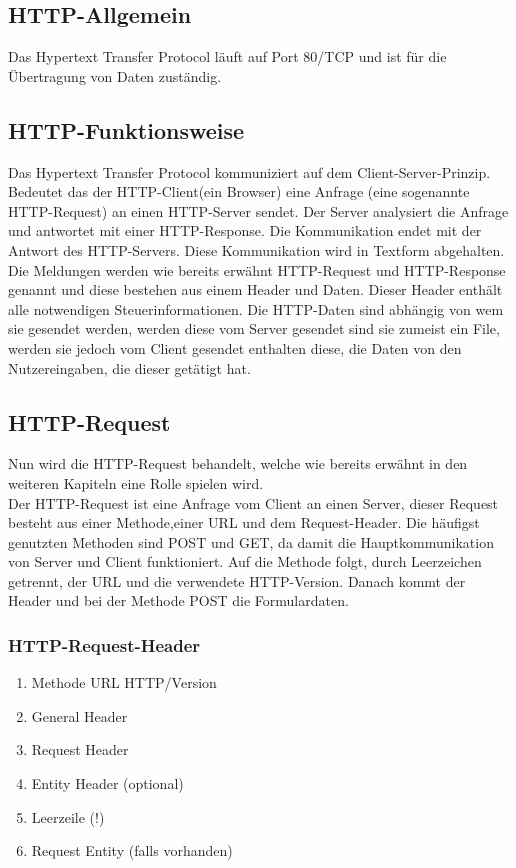 \subsection{HTTP-Allgemein}
Das Hypertext Transfer Protocol läuft auf Port 80/TCP und ist für die Übertragung von Daten zuständig.
\subsection{HTTP-Funktionsweise}
Das Hypertext Transfer Protocol kommuniziert auf dem Client-Server-Prinzip. Bedeutet das der HTTP-Client(ein Browser) eine Anfrage (eine sogenannte HTTP-Request) an einen HTTP-Server sendet. Der Server analysiert die Anfrage und antwortet mit einer HTTP-Response. Die Kommunikation endet mit der Antwort des HTTP-Servers. Diese Kommunikation wird in Textform abgehalten. Die Meldungen werden wie bereits erwähnt HTTP-Request und HTTP-Response genannt und diese bestehen aus einem Header und Daten. Dieser Header enthält alle notwendigen Steuerinformationen. Die HTTP-Daten sind abhängig von wem sie gesendet werden, werden diese vom Server gesendet sind sie zumeist ein File, werden sie jedoch vom Client gesendet enthalten diese, die  Daten von den Nutzereingaben, die dieser getätigt hat.
\subsection{HTTP-Request}
Nun wird die HTTP-Request behandelt, welche wie bereits erwähnt in den weiteren Kapiteln eine Rolle spielen wird.\\Der HTTP-Request ist eine Anfrage vom Client an einen Server, dieser Request besteht aus einer Methode,einer URL und dem Request-Header. Die häufigst genutzten Methoden sind POST und GET, da damit die Hauptkommunikation von Server und Client funktioniert. Auf die Methode folgt, durch Leerzeichen getrennt, der URL und die verwendete HTTP-Version. Danach kommt der Header und bei der Methode POST die Formulardaten.
\subsubsection{HTTP-Request-Header}
\begin{enumerate}
\item Methode URL HTTP/Version
\item General Header
\item Request Header
\item Entity Header (optional)
\item Leerzeile (!)
\item Request Entity (falls vorhanden)
\end{enumerate}
